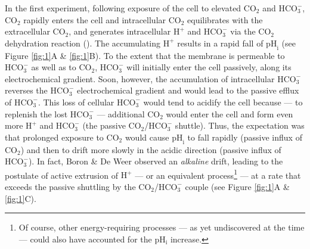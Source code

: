 \documentclass[fleqn,10pt]{physiome}
\begin{document}
In the first experiment, following exposure of the cell to elevated $\mathrm{CO_2}$ and $\mathrm{HCO_3^-}$, $\mathrm{CO_2}$ rapidly enters the cell and intracellular $\mathrm{CO_2}$ equilibrates with the extracellular $\mathrm{CO_2}$, and generates intracellular $\mathrm{H^+}$ and $\mathrm{HCO_3^-}$ via the $\mathrm{CO_2}$ dehydration reaction (). The accumulating $\mathrm{H^+}$ results in a rapid fall of $\mathrm{{pH}_i}$ (see Figure \ref{fig:1}A \& \ref{fig:1}B). To the extent that the membrane is permeable to $\mathrm{HCO_3^-}$ as well as to $\mathrm{CO_2}$, $\mathrm{HCO_3^-}$ will initially enter the cell passively, along its electrochemical gradient. Soon, however, the accumulation of intracellular $\mathrm{HCO_3^-}$ reverses the $\mathrm{HCO_3^-}$ electrochemical gradient and would lead to the passive efflux of $\mathrm{HCO_3^-}$. This loss of cellular $\mathrm{HCO_3^-}$ would tend to acidify the cell because --- to replenish the lost $\mathrm{HCO_3^-}$ --- additional $\mathrm{CO_2}$ would enter the cell and form even more $\mathrm{H^+}$ and $\mathrm{HCO_3^-}$ (the passive $\mathrm{CO_2}$/$\mathrm{HCO_3^-}$ shuttle). Thus, the expectation was that prolonged exposure to $\mathrm{CO_2}$ would cause $\mathrm{{pH}_i}$ to fall rapidly (passive influx of $\mathrm{CO_2}$) and then to drift more slowly in the acidic direction (passive influx of $\mathrm{HCO_3^-}$). In fact, Boron \& De Weer observed an \textit{alkaline} drift, leading to the postulate of active extrusion of $\mathrm{H^+}$ --- or an equivalent process\footnote{Of course, other energy-requiring processes --- as yet undiscovered at the time --- could also have accounted for the $\mathrm{pH_i}$ increase.} --- at a rate that exceeds the passive shuttling by the $\mathrm{CO_2}$/$\mathrm{HCO_3^-}$ couple (see Figure \ref{fig:1}A \& \ref{fig:1}C).\\
\end{document}
